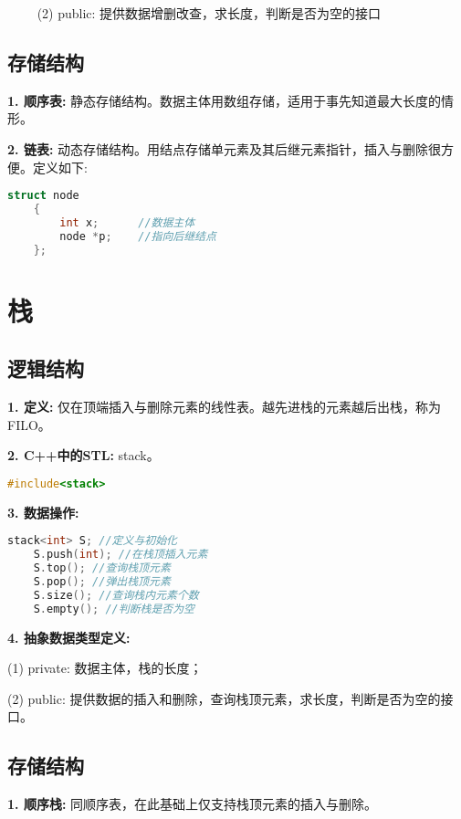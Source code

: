 ~~~~ (2) public: 提供数据增删改查，求长度，判断是否为空的接口

\subsection{存储结构}

\textbf{1. 顺序表: }静态存储结构。数据主体用数组存储，适用于事先知道最大长度的情形。

\textbf{2. 链表: }动态存储结构。用结点存储单元素及其后继元素指针，插入与删除很方便。定义如下: 
\begin{lstlisting}[language=C++]
    struct node
    {
        int x;      //数据主体
        node *p;    //指向后继结点
    };
\end{lstlisting}

\section{栈}

\subsection{逻辑结构}

\textbf{1. 定义: }仅在顶端插入与删除元素的线性表。越先进栈的元素越后出栈，称为FILO。

\textbf{2. C++中的STL: }stack。

\begin{lstlisting}[language=C++]
    #include<stack>
\end{lstlisting}

\textbf{3. 数据操作: }

\begin{lstlisting}[language=C++]
    stack<int> S; //定义与初始化
    S.push(int); //在栈顶插入元素
    S.top(); //查询栈顶元素
    S.pop(); //弹出栈顶元素
    S.size(); //查询栈内元素个数
    S.empty(); //判断栈是否为空
\end{lstlisting}

\textbf{4. 抽象数据类型定义: }

(1) private: 数据主体，栈的长度；

(2) public: 提供数据的插入和删除，查询栈顶元素，求长度，判断是否为空的接口。

\subsection{存储结构}

\textbf{1. 顺序栈: }同顺序表，在此基础上仅支持栈顶元素的插入与删除。

